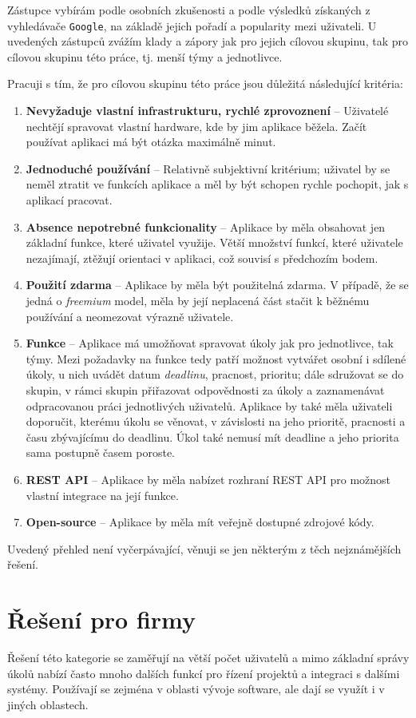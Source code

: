 \documentclass[thesis=B,czech]{FITthesis}[2012/06/26]
\newcommand{\crita}{Nevyžaduje vlastní infrastrukturu, rychlé zprovoznení}
\newcommand{\critb}{Jednoduché používání}
\newcommand{\critc}{Absence nepotrebné funkcionality}
\newcommand{\critd}{Použití zdarma}
\newcommand{\crite}{Funkce}
\newcommand{\critf}{REST API}
\newcommand{\critg}{Open-source}
\begin{document}
Zástupce vybírám podle osobních zkušenosti a podle výsledků získaných z vyhledávače \texttt{Google}, na základě jejich pořadí a popularity mezi uživateli. U uvedených zástupců zvážím klady a zápory jak pro jejich cílovou skupinu, tak pro cílovou skupinu této práce, tj. menší týmy a jednotlivce.

Pracuji s tím, že pro cílovou skupinu této práce jsou důležitá následující kritéria:
\begin{enumerate}
	\item \textbf{\crita} -- Uživatelé nechtějí spravovat vlastní hardware, kde by jim aplikace běžela. Začít používat aplikaci má být otázka maximálně minut.
	\item \textbf{\critb} -- Relativně subjektivní kritérium; uživatel by se neměl ztratit ve funkcích aplikace a měl by být schopen rychle pochopit, jak s aplikací pracovat.
	\item \textbf{\critc} -- 	Aplikace by měla obsahovat jen základní funkce, které uživatel využije. Větší množství funkcí, které uživatele nezajímají, ztěžují orientaci v aplikaci, což souvisí s předchozím bodem.
	\item \textbf{\critd} -- Aplikace by měla být použitelná zdarma. V případě, že se jedná o \textit{freemium} model, měla by její neplacená část stačit k běžnému používání a neomezovat výrazně uživatele.
	\item \textbf{\crite} -- Aplikace má umožňovat spravovat úkoly jak pro jednotlivce, tak týmy. Mezi požadavky na funkce tedy patří možnost vytvářet osobní i sdílené úkoly, u nich uvádět datum \textit{deadlinu}, pracnost, prioritu; dále sdružovat se do skupin, v rámci skupin přiřazovat odpovědnosti za úkoly a zaznamenávat odpracovanou práci jednotlivých uživatelů. Aplikace by také měla uživateli doporučit, kterému úkolu se věnovat, v závislosti na jeho prioritě, pracnosti a času zbývajícímu do deadlinu. Úkol také nemusí mít deadline a jeho priorita sama postupně časem poroste.
	\item \textbf{\critf} -- Aplikace by měla nabízet rozhraní REST API pro možnost vlastní integrace na její funkce.
	\item \textbf{\critg} -- Aplikace by měla mít veřejně dostupné zdrojové kódy.
\end{enumerate}
Uvedený přehled není vyčerpávající, věnuji se jen některým z těch nejznámějších řešení. 

	\section{Řešení pro firmy}
		\label{sec:solutions-companies}
		Řešení této kategorie se zaměřují na větší počet uživatelů a mimo základní správy úkolů nabízí často mnoho dalších funkcí pro řízení projektů a integraci s dalšími systémy. Používají se zejména v oblasti vývoje software, ale dají se využít i v jiných oblastech.
		
\end{document}
